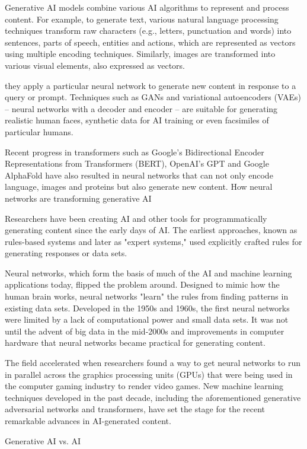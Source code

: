Generative AI models combine various AI algorithms to represent and process content. For example, to generate text, various natural language processing techniques transform raw characters (e.g., letters, punctuation and words) into sentences, parts of speech, entities and actions, which are represented as vectors using multiple encoding techniques. Similarly, images are transformed into various visual elements, also expressed as vectors.

they apply a particular neural network to generate new content in response to a query or prompt. Techniques such as GANs and variational autoencoders (VAEs) -- neural networks with a decoder and encoder -- are suitable for generating realistic human faces, synthetic data for AI training or even facsimiles of particular humans.

Recent progress in transformers such as Google's Bidirectional Encoder Representations from Transformers (BERT), OpenAI's GPT and Google AlphaFold have also resulted in neural networks that can not only encode language, images and proteins but also generate new content. 
How neural networks are transforming generative AI

Researchers have been creating AI and other tools for programmatically generating content since the early days of AI. The earliest approaches, known as rules-based systems and later as "expert systems," used explicitly crafted rules for generating responses or data sets.

Neural networks, which form the basis of much of the AI and machine learning applications today, flipped the problem around. Designed to mimic how the human brain works, neural networks "learn" the rules from finding patterns in existing data sets. Developed in the 1950s and 1960s, the first neural networks were limited by a lack of computational power and small data sets. It was not until the advent of big data in the mid-2000s and improvements in computer hardware that neural networks became practical for generating content.

The field accelerated when researchers found a way to get neural networks to run in parallel across the graphics processing units (GPUs) that were being used in the computer gaming industry to render video games. New machine learning techniques developed in the past decade, including the aforementioned generative adversarial networks and transformers, have set the stage for the recent remarkable advances in AI-generated content.


Generative AI vs. AI

